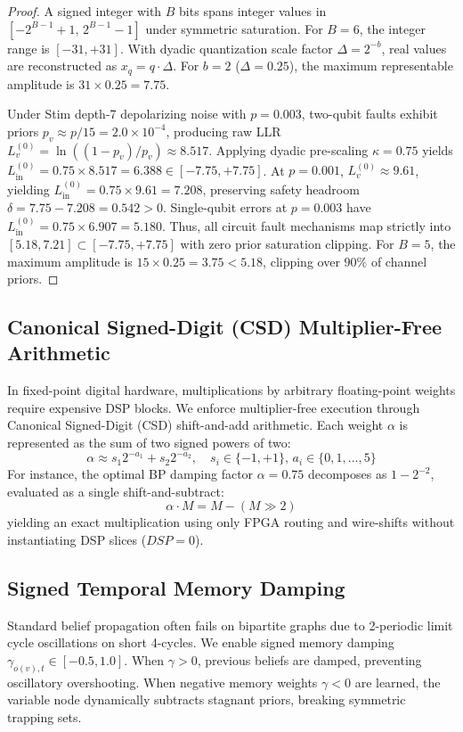 \documentclass[journal]{IEEEtran}
\begin{document}
\begin{proof}
A signed integer with $B$ bits spans integer values in $[-2^{B-1}+1, \, 2^{B-1}-1]$ under symmetric saturation. For $B=6$, the integer range is $[-31, +31]$. With dyadic quantization scale factor $\Delta = 2^{-b}$, real values are reconstructed as $x_q = q \cdot \Delta$. For $b=2$ ($\Delta = 0.25$), the maximum representable amplitude is $31 \times 0.25 = 7.75$.

Under Stim depth-7 depolarizing noise with $p = 0.003$, two-qubit faults exhibit priors $p_v \approx p/15 = 2.0 \times 10^{-4}$, producing raw LLR $L_v^{(0)} = \ln((1-p_v)/p_v) \approx 8.517$. Applying dyadic pre-scaling $\kappa = 0.75$ yields $L_{\text{in}}^{(0)} = 0.75 \times 8.517 = 6.388 \in [-7.75, +7.75]$. At $p = 0.001$, $L_v^{(0)} \approx 9.61$, yielding $L_{\text{in}}^{(0)} = 0.75 \times 9.61 = 7.208$, preserving safety headroom $\delta = 7.75 - 7.208 = 0.542 > 0$. Single-qubit errors at $p=0.003$ have $L_{\text{in}}^{(0)} = 0.75 \times 6.907 = 5.180$. Thus, all circuit fault mechanisms map strictly into $[5.18, 7.21] \subset [-7.75, +7.75]$ with zero prior saturation clipping. For $B=5$, the maximum amplitude is $15 \times 0.25 = 3.75 < 5.18$, clipping over $90\%$ of channel priors.
\end{proof}

\subsection{Canonical Signed-Digit (CSD) Multiplier-Free Arithmetic}
In fixed-point digital hardware, multiplications by arbitrary floating-point weights require expensive DSP blocks. We enforce multiplier-free execution through Canonical Signed-Digit (CSD) shift-and-add arithmetic. Each weight $\alpha$ is represented as the sum of two signed powers of two:
\begin{equation}
    \alpha \approx s_1 2^{-a_1} + s_2 2^{-a_2}, \quad s_i \in \{-1, +1\}, \, a_i \in \{0, 1, \dots, 5\}
\end{equation}
For instance, the optimal BP damping factor $\alpha = 0.75$ decomposes as $1 - 2^{-2}$, evaluated as a single shift-and-subtract:
\begin{equation}
    \alpha \cdot M = M - (M \gg 2)
\end{equation}
yielding an exact multiplication using only FPGA routing and wire-shifts without instantiating DSP slices ($DSP=0$).

\subsection{Signed Temporal Memory Damping}
Standard belief propagation often fails on bipartite graphs due to 2-periodic limit cycle oscillations on short 4-cycles. We enable signed memory damping $\gamma_{o(v), t} \in [-0.5, 1.0]$. When $\gamma > 0$, previous beliefs are damped, preventing oscillatory overshooting. When negative memory weights $\gamma < 0$ are learned, the variable node dynamically subtracts stagnant priors, breaking symmetric trapping sets.
\end{document}
